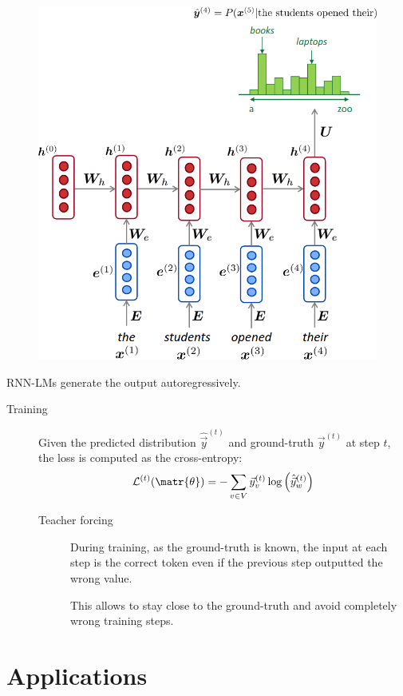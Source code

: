 \begin{description}
    \begin{figure}[H]
        \centering
        \includegraphics[width=0.4\linewidth]{./img/rnn_lm.png}
    \end{figure}

    \begin{remark}
        RNN-LMs generate the output autoregressively.
    \end{remark}

    \begin{description}
        \item[Training]
            Given the predicted distribution $\hat{\vec{y}}^{(t)}$ and ground-truth $\vec{y}^{(t)}$ at step $t$, the loss is computed as the cross-entropy:
            \[ \mathcal{L}^{(t)}(\matr{\theta}) = - \sum_{v \in V} \vec{y}_v^{(t)} \log\left( \hat{\vec{y}}_w^{(t)} \right) \]

            \begin{description}
                \item[Teacher forcing] 
                    During training, as the ground-truth is known, the input at each step is the correct token even if the previous step outputted the wrong value.

                    \begin{remark}
                        This allows to stay close to the ground-truth and avoid completely wrong training steps.
                    \end{remark}
            \end{description}
    \end{description}
\end{description}



\section{Applications}

